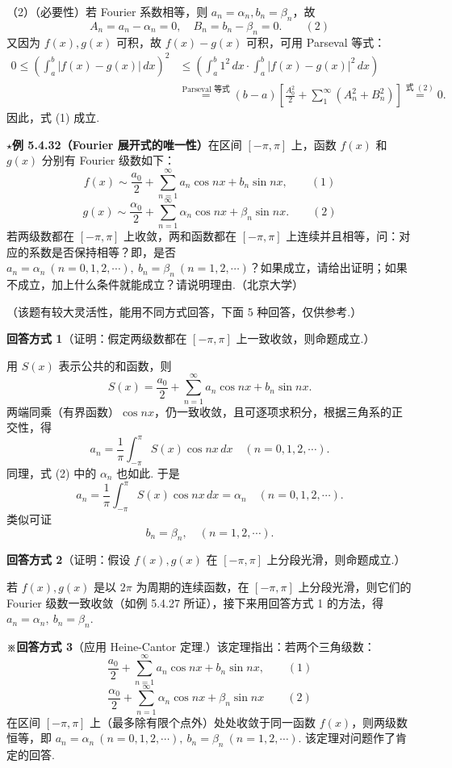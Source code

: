\documentclass[UTF8,12pt,a4paper,fontset=fandol]{ctexart}
\providecommand{\xlongequal}[1]{\stackrel{#1}{=}}
\begin{document}
（2）（必要性）若 Fourier 系数相等，则 $a_n=\alpha_n,b_n=\beta_n$，故
\[
  A_n=a_n-\alpha_n=0,\quad B_n=b_n-\beta_n=0. \qquad(2)
\]
又因为 $f(x),g(x)$ 可积，故 $f(x)-g(x)$ 可积，可用 Parseval 等式：
\[
\begin{aligned}
0\le\left(\int_a^b|f(x)-g(x)|\,dx\right)^2
&\le\left(\int_a^b1^2\,dx\cdot\int_a^b|f(x)-g(x)|^2\,dx\right)\\
&\xlongequal{\text{Parseval 等式}}
(b-a)\left[\frac{A_0^2}{2}+\sum_1^{\infty}(A_n^2+B_n^2)\right]
\xlongequal{\text{式 }(2)}0.
\end{aligned}
\]
因此，式 (1) 成立.

\noindent\(\star\)\textbf{例 5.4.32（Fourier 展开式的唯一性）}\quad 在区间 $[-\pi,\pi]$ 上，函数 $f(x)$ 和
$g(x)$ 分别有 Fourier 级数如下：
\[
  f(x)\sim\frac{a_0}{2}+\sum_{n=1}^{\infty}a_n\cos nx+b_n\sin nx, \qquad(1)
\]
\[
  g(x)\sim\frac{\alpha_0}{2}+\sum_{n=1}^{\infty}\alpha_n\cos nx+\beta_n\sin nx. \qquad(2)
\]
若两级数都在 $[-\pi,\pi]$ 上收敛，两和函数都在 $[-\pi,\pi]$ 上连续并且相等，问：对应的系数是否保持相等？即，是否
$a_n=\alpha_n\ (n=0,1,2,\cdots),\ b_n=\beta_n\ (n=1,2,\cdots)$？如果成立，请给出证明；如果不成立，加上什么条件就能成立？请说明理由.（北京大学）

（该题有较大灵活性，能用不同方式回答，下面 5 种回答，仅供参考.）

\noindent\textbf{回答方式 1}\quad （证明：假定两级数都在 $[-\pi,\pi]$ 上一致收敛，则命题成立.）

用 $S(x)$ 表示公共的和函数，则
\[
  S(x)=\frac{a_0}{2}+\sum_{n=1}^{\infty}a_n\cos nx+b_n\sin nx.
\]
两端同乘（有界函数）$\cos nx$，仍一致收敛，且可逐项求积分，根据三角系的正交性，得
\[
  a_n=\frac1\pi\int_{-\pi}^{\pi}S(x)\cos nx\,dx\quad(n=0,1,2,\cdots).
\]
同理，式 (2) 中的 $\alpha_n$ 也如此. 于是
\[
  a_n=\frac1\pi\int_{-\pi}^{\pi}S(x)\cos nx\,dx=\alpha_n\quad(n=0,1,2,\cdots).
\]
类似可证
\[
  b_n=\beta_n,\quad(n=1,2,\cdots).
\]

\noindent\textbf{回答方式 2}\quad （证明：假设 $f(x),g(x)$ 在 $[-\pi,\pi]$ 上分段光滑，则命题成立.）

若 $f(x),g(x)$ 是以 $2\pi$ 为周期的连续函数，在 $[-\pi,\pi]$ 上分段光滑，则它们的 Fourier 级数一致收敛（如例 5.4.27 所证），接下来用回答方式 1 的方法，得
$a_n=\alpha_n,\ b_n=\beta_n$.

\noindent\textbf{※回答方式 3}\quad （应用 Heine-Cantor 定理.）该定理指出：若两个三角级数：
\[
  \frac{a_0}{2}+\sum_{n=1}^{\infty}a_n\cos nx+b_n\sin nx, \qquad(1)
\]
\[
  \frac{\alpha_0}{2}+\sum_{n=1}^{\infty}\alpha_n\cos nx+\beta_n\sin nx \qquad(2)
\]
在区间 $[-\pi,\pi]$ 上（最多除有限个点外）处处收敛于同一函数 $f(x)$，则两级数恒等，即
$a_n=\alpha_n\ (n=0,1,2,\cdots),\ b_n=\beta_n\ (n=1,2,\cdots)$. 该定理对问题作了肯定的回答.
\end{document}
